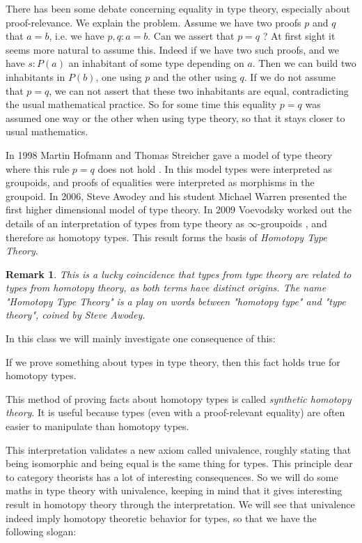 \documentclass{article}
\newtheorem{remark}{Remark}
\begin{document}
There has been some debate concerning equality in type theory, especially about proof-relevance. We explain the problem. Assume we have two proofs $p$ and $q$ that $a=b$, i.e. we have $p,q:a=b$. Can we assert that $p=q$ ? At first sight it seems more natural to assume this. Indeed if we have two such proofs, and we have $s:P(a)$ an inhabitant of some type depending on $a$. Then we can build two inhabitants in $P(b)$, one using $p$ and the other using $q$. If we do not assume that $p=q$, we can not assert that these two inhabitants are equal, contradicting the usual mathematical practice. So for some time this equality $p=q$ was assumed one way or the other when using type theory, so that it stays closer to usual mathematics.

In 1998 Martin Hofmann and Thomas Streicher gave a model of type theory where this rule $p=q$ does not hold \cite{hofmann1998groupoid}. In this model types were interpreted as groupoids, and proofs of equalities were interpreted as morphisms in the groupoid. In 2006, Steve Awodey and his student Michael Warren presented the first higher dimensional model of type theory. In 2009 Voevodsky worked out the details of an interpretation of types from type theory as $\infty$-groupoids \cite{kapulkin2012simplicial}, and therefore as homotopy types. This result forms the basis of \emph{Homotopy Type Theory}. 

\begin{remark}
This is a lucky coincidence that types from type theory are related to types from homotopy theory, as both terms have distinct origins. The name "Homotopy Type Theory" is a play on words between "homotopy type" and "type theory", coined by Steve Awodey.
\end{remark}

In this class we will mainly investigate one consequence of this: 

\begin{center}
If we prove something about types in type theory, then this fact holds true for homotopy types.
\end{center}

This method of proving facts about homotopy types is called \emph{synthetic homotopy theory}. It is useful because types (even with a proof-relevant equality) are often easier to manipulate than homotopy types. 

This interpretation validates a new axiom called univalence, roughly stating that being isomorphic and being equal is the same thing for types. This principle dear to category theorists has a lot of interesting consequences. So we will do some maths in type theory with univalence, keeping in mind that it gives interesting result in homotopy theory through the interpretation. We will see that univalence indeed imply homotopy theoretic behavior for types, so that we have the following slogan:
\end{document}
